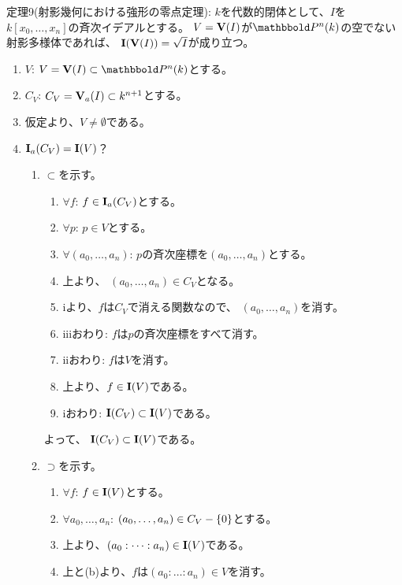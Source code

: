 \begin{framed}
  定理9(射影幾何における強形の零点定理):
  $k$を代数的閉体として、$I$を$k[x_0,\dots,x_n]$の斉次イデアルとする。
  $V=\textbf V(I)$が$\P^n(k)$の空でない射影多様体であれば、
  $\textbf I(\textbf V(I)) = \sqrt{I}$が成り立つ。
\end{framed}
\begin{myproof}
  \begin{enumerate}
    \item $V$:
    $V=\var(I) \subset \P^n(k)$とする。
    \item $C_V$:
    $C_V = \textbf V_a(I) \subset k^{n+1}$とする。
    \item
    仮定より、$V\neq \emptyset$である。
    \item $\textbf I_a(C_V) = \textbf I(V)$？
    \begin{enumerate}
      \item $\subset$を示す。
      \begin{enumerate}
        \item $\forall f$: $f\in \textbf I_a(C_V)$とする。
        \item
        $\forall p$: $p\in V$とする。
        \item
        $\forall (a_0,\dots,a_n)$: $p$の斉次座標を$(a_0,\dots,a_n)$とする。
        \item 上より、
        $(a_0,\dots,a_n)\in C_V$となる。
        \item
        iより、$f$は$C_V$で消える関数なので、
        $(a_0,\dots,a_n)$を消す。
        \item
        iiiおわり:
        $f$は$p$の斉次座標をすべて消す。
        \item
        iiおわり: $f$は$V$を消す。
        \item
        上より、$f\in \textbf I(V)$である。
        \item
        iおわり: $\textbf I(C_V)\subset \textbf I(V)$である。
      \end{enumerate}
      よって、 $\textbf I(C_V)\subset \textbf I(V)$である。
      \item $\supset$を示す。
      \begin{enumerate}
        \item $\forall f$: $f\in \textbf I(V)$とする。
        \item
        $\forall a_0,\dots,a_n$: $(a_0,\dots,a_n) \in C_V-\{0\}$とする。
        \item
        上より、$(a_0:\dots:a_n) \in \textbf I(V)$である。
        \item
        上と(b)より、$f$は$(a_0:\dots:a_n) \in V$を消す。

\end{enumerate}
\end{enumerate}
\end{enumerate}
\end{myproof}
